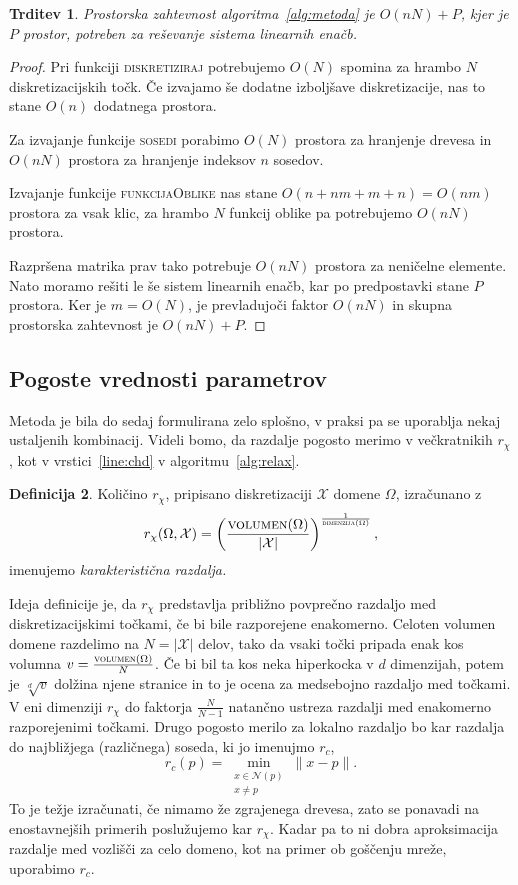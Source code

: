 \documentclass[12pt,a4paper,twoside]{article}
\theoremstyle{definition} %
\newtheorem{definicija}{Definicija}[section]
\theoremstyle{plain} %
\newtheorem{trditev}[definicija]{Trditev}
\numberwithin{equation}{section}
\newcommand{\Nc}{\mathcal{N}}
\newcommand{\X}{\mathcal{X}}
\begin{document}
\begin{trditev}
  Prostorska zahtevnost algoritma~\ref{alg:metoda} je $O(nN) + P$, kjer je $P$
  prostor, potreben za reševanje sistema linearnih enačb.
\end{trditev}
\begin{proof}
Pri funkciji \textsc{diskretiziraj} potrebujemo $O(N)$ spomina za hrambo $N$
diskretizacijskih točk. Če izvajamo še dodatne izboljšave diskretizacije, nas to
stane $O(n)$ dodatnega prostora.

Za izvajanje funkcije \textsc{sosedi} porabimo $O(N)$ prostora za hranjenje drevesa
in $O(nN)$ prostora za hranjenje indeksov $n$ sosedov.

Izvajanje funkcije \textsc{funkcijaOblike} nas stane $O(n+nm+m+n) = O(nm)$
prostora za vsak klic, za hrambo $N$ funkcij oblike pa potrebujemo $O(nN)$
prostora.

Razpršena matrika prav tako potrebuje $O(nN)$ prostora za neničelne elemente.
Nato moramo rešiti le še sistem linearnih enačb, kar po predpostavki stane $P$
prostora. Ker je $m = O(N)$, je prevladujoči faktor $O(nN)$ in skupna prostorska
zahtevnost je $O(nN) + P$.
\end{proof}

\subsection{Pogoste vrednosti parametrov}
Metoda je bila do sedaj formulirana zelo splošno, v praksi pa se uporablja nekaj
ustaljenih kombinacij. Videli bomo, da razdalje pogosto merimo v večkratnikih
$r_\chi$, kot v vrstici~\ref{line:chd} v algoritmu~\ref{alg:relax}.
\begin{definicija}
  Količino $r_\chi$, pripisano diskretizaciji $\X$ domene $\Omega$, izračunano z
  \begin{equation}
    r_\chi(\Omega, \X) = \left( \frac{\textsc{volumen}(\Omega)}{|\X|}
    \right)^\frac{1}{\textsc{dimenzija}(\Omega)},
  \end{equation}
  imenujemo \emph{karakteristična razdalja.}
\end{definicija}
Ideja definicije je, da $r_\chi$ predstavlja približno povprečno razdaljo med
diskretizacijskimi točkami, če bi bile razporejene enakomerno. Celoten volumen
domene razdelimo na $N = |\X|$ delov, tako da vsaki točki pripada enak kos
volumna $v = \frac{\textsc{volumen}(\Omega)}{N}$. Če bi
bil ta kos neka hiperkocka v $d$ dimenzijah, potem je $\sqrt[d]{v}$ dolžina
njene stranice in to je ocena za medsebojno razdaljo med točkami.
V eni dimenziji $r_\chi$ do faktorja $\frac{N}{N-1}$ natančno ustreza razdalji
med enakomerno razporejenimi točkami.
Drugo pogosto merilo za lokalno razdaljo bo kar razdalja do najbližjega
(različnega) soseda, ki jo imenujmo $r_c$,
\begin{equation}
  r_c(p) = \min_{\substack{x \in \Nc(p) \\ x \neq p}} \|x-p\|.
  \label{eq:min-dist}
\end{equation}
To je težje izračunati, če nimamo že
zgrajenega drevesa, zato se ponavadi na enostavnejših primerih poslužujemo kar
$r_\chi$. Kadar pa to ni dobra aproksimacija razdalje med vozlišči za celo
domeno, kot na primer ob goščenju mreže, uporabimo $r_c$.
\end{document}
